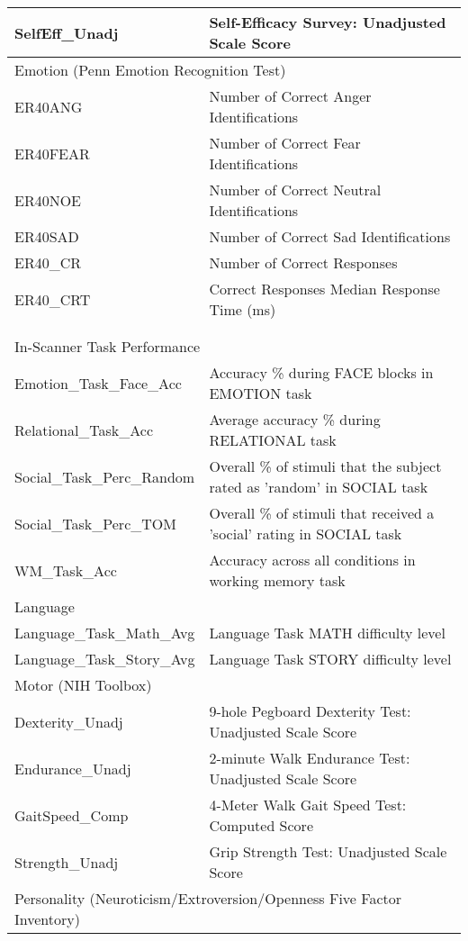 \documentclass{article}
\begin{document}
\begin{longtable}{ll}
SelfEff\_Unadj & Self-Efficacy Survey: Unadjusted Scale Score\\
\midrule
\multicolumn{2}{l}{Emotion (Penn Emotion Recognition Test)}\\
\midrule
ER40ANG & Number of Correct Anger Identifications\\
ER40FEAR & Number of Correct Fear Identifications\\
ER40NOE & Number of Correct Neutral Identifications\\
ER40SAD & Number of Correct Sad Identifications\\
ER40\_CR & Number of Correct Responses\\
ER40\_CRT & Correct Responses Median Response Time (ms)\\
\midrule 
\\ %
\\ %
\midrule 
\multicolumn{2}{l}{In-Scanner Task Performance}\\
\midrule
Emotion\_Task\_Face\_Acc & Accuracy \% during FACE blocks in EMOTION task\\
Relational\_Task\_Acc & Average accuracy \% during RELATIONAL task\\
Social\_Task\_Perc\_Random & Overall \% of stimuli that the subject rated as 'random' in SOCIAL task\\
Social\_Task\_Perc\_TOM & Overall \% of stimuli that received a 'social' rating in SOCIAL task\\
WM\_Task\_Acc & Accuracy across all conditions in working memory task\\
\midrule
\multicolumn{2}{l}{Language}\\
\midrule
Language\_Task\_Math\_Avg & Language Task MATH difficulty level\\
Language\_Task\_Story\_Avg & Language Task STORY difficulty level\\
\midrule
\multicolumn{2}{l}{Motor (NIH Toolbox)}\\
\midrule
Dexterity\_Unadj & 9-hole Pegboard Dexterity Test: Unadjusted Scale Score\\
Endurance\_Unadj & 2-minute Walk Endurance Test: Unadjusted Scale Score \\
GaitSpeed\_Comp & 4-Meter Walk Gait Speed Test: Computed Score\\
Strength\_Unadj & Grip Strength Test: Unadjusted Scale Score\\
\midrule
\multicolumn{2}{l}{Personality (Neuroticism/Extroversion/Openness Five Factor Inventory)}\\

\end{longtable}
\end{document}
